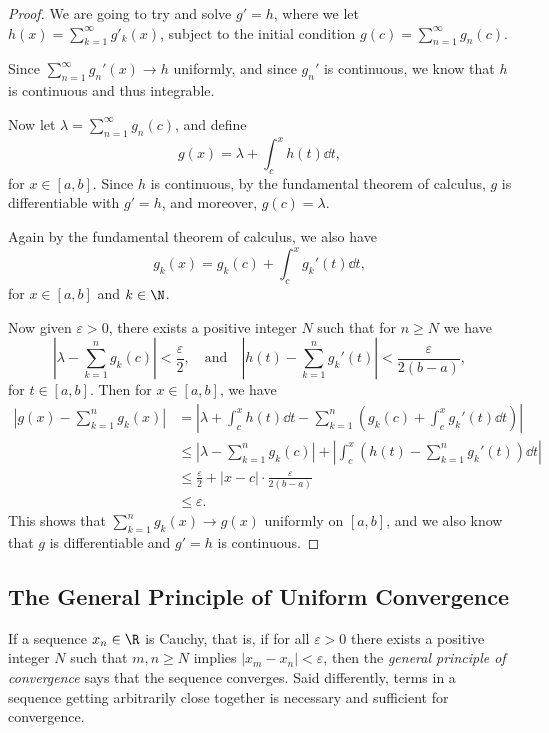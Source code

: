 \begin{proof}
    We are going to try and solve $g' = h$, where we let $h(x) = \sum_{k = 1}^{\infty} g'_k(x)$, subject to the initial condition $g(c) = \sum_{n = 1}^{\infty} g_n(c)$.

    Since $\sum_{n = 1}^{\infty} g_n'(x)\rightarrow h$ uniformly, and since $g_n'$ is continuous, we know that $h$ is continuous and thus integrable. 

    Now let $\lambda = \sum_{n = 1}^{\infty} g_n(c)$, and define
    $$
    g(x) = \lambda + \int_c^x h(t) \dd t,
    $$
    for $x \in [a, b]$. Since $h$ is continuous, by the fundamental theorem of calculus, $g$ is differentiable with $g' = h$, and moreover, $g(c) = \lambda$.

    Again by the fundamental theorem of calculus, we also have
    $$
    g_k(x) = g_k(c) + \int_c^x g_k'(t) \dd t,
    $$
    for $x \in [a, b]$ and $k \in \N$. 

    Now given $\varepsilon > 0$, there exists a positive integer $N$ such that for $n \geq N$ we have
    $$
    \left|\lambda - \sum_{k = 1}^n g_k(c)\right| < \frac{\varepsilon}{2}, \quad \text{and} \quad \left|h(t) - \sum_{k = 1}^n g_k'(t)\right| < \frac{\varepsilon}{2(b - a)},
    $$
    for $t \in [a, b]$. Then for $x \in [a, b]$, we have
    \begin{align*}
        \left|g(x) - \sum_{k = 1}^n g_k(x)\right| &= 
        \left|\lambda + \int_c^x h(t)\dd t - \sum_{k = 1}^n \left(g_k(c) + \int_c^x g_k'(t) \dd t \right)\right|
        \\
        & \leq \left|\lambda - \sum_{k = 1}^n g_k(c)\right| + \left|\int_c^x \left(h(t) - \sum_{k = 1}^n g_k'(t) \right) \dd t\right| \\
        &\leq \frac{\varepsilon}{2} + |x - c| \cdot \frac{\varepsilon}{2(b - a)} \\&\leq \varepsilon.
    \end{align*}
    This shows that $\sum_{k = 1}^n g_k(x) \rightarrow g(x)$ uniformly on $[a, b]$, and we also know that $g$ is differentiable and $g' = h$ is continuous.
\end{proof}

\subsection{The General Principle of Uniform Convergence}

If a sequence $x_n \in \R$ is Cauchy, that is, if for all $\varepsilon > 0$ there exists a positive integer $N$ such that $m, n \geq N$ implies $|x_m - x_n| < \varepsilon$, then the \emph{general principle of convergence} says that the sequence converges.
Said differently, terms in a sequence getting arbitrarily close together is necessary and sufficient for convergence. 

